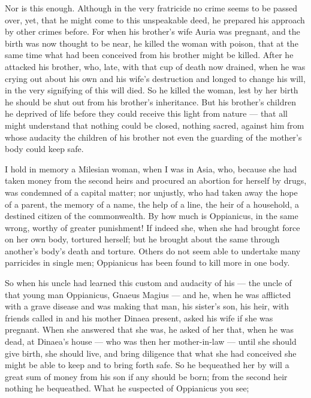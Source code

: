  Nor is this enough. Although in the very fratricide no crime seems to be passed over, yet, that he might come to this unspeakable deed, he prepared his approach by other crimes before. For when his brother's wife Auria was pregnant, and the birth was now thought to be near, he killed the woman with poison, that at the same time what had been conceived from his brother might be killed. After he attacked his brother, who, late, with that cup of death now drained, when he was crying out about his own and his wife's destruction and longed to change his will, in the very signifying of this will died. So he killed the woman, lest by her birth he should be shut out from his brother's inheritance. But his brother's children he deprived of life before they could receive this light from nature --- that all might understand that nothing could be closed, nothing sacred, against him from whose audacity the children of his brother not even the guarding of the mother's body could keep safe.

 I hold in memory a Milesian woman, when I was in Asia, who, because she had taken money from the second heirs and procured an abortion for herself by drugs, was condemned of a capital matter; nor unjustly, who had taken away the hope of a parent, the memory of a name, the help of a line, the heir of a household, a destined citizen of the commonwealth. By how much is Oppianicus, in the same wrong, worthy of greater punishment! If indeed she, when she had brought force on her own body, tortured herself; but he brought about the same through another's body's death and torture. Others do not seem able to undertake many parricides in single men; Oppianicus has been found to kill more in one body.

 So when his uncle had learned this custom and audacity of his --- the uncle of that young man Oppianicus, Gnaeus Magius --- and he, when he was afflicted with a grave disease and was making that man, his sister's son, his heir, with friends called in and his mother Dinaea present, asked his wife if she was pregnant. When she answered that she was, he asked of her that, when he was dead, at Dinaea's house --- who was then her mother-in-law --- until she should give birth, she should live, and bring diligence that what she had conceived she might be able to keep and to bring forth safe. So he bequeathed her by will a great sum of money from his son if any should be born; from the second heir nothing he bequeathed. What he suspected of Oppianicus you see;

